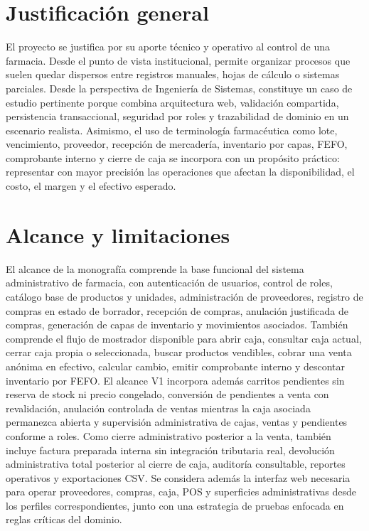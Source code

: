 \section{Justificación general}

El proyecto se justifica por su aporte técnico y operativo al control de una farmacia. Desde el punto de vista institucional, permite organizar procesos que suelen quedar dispersos entre registros manuales, hojas de cálculo o sistemas parciales. Desde la perspectiva de Ingeniería de Sistemas, constituye un caso de estudio pertinente porque combina arquitectura web, validación compartida, persistencia transaccional, seguridad por roles y trazabilidad de dominio en un escenario realista. Asimismo, el uso de terminología farmacéutica como lote, vencimiento, proveedor, recepción de mercadería, inventario por capas, FEFO, comprobante interno y cierre de caja se incorpora con un propósito práctico: representar con mayor precisión las operaciones que afectan la disponibilidad, el costo, el margen y el efectivo esperado.

\section{Alcance y limitaciones}

El alcance de la monografía comprende la base funcional del sistema administrativo de farmacia, con autenticación de usuarios, control de roles, catálogo base de productos y unidades, administración de proveedores, registro de compras en estado de borrador, recepción de compras, anulación justificada de compras, generación de capas de inventario y movimientos asociados. También comprende el flujo de mostrador disponible para abrir caja, consultar caja actual, cerrar caja propia o seleccionada, buscar productos vendibles, cobrar una venta anónima en efectivo, calcular cambio, emitir comprobante interno y descontar inventario por FEFO. El alcance V1 incorpora además carritos pendientes sin reserva de stock ni precio congelado, conversión de pendientes a venta con revalidación, anulación controlada de ventas mientras la caja asociada permanezca abierta y supervisión administrativa de cajas, ventas y pendientes conforme a roles. Como cierre administrativo posterior a la venta, también incluye factura preparada interna sin integración tributaria real, devolución administrativa total posterior al cierre de caja, auditoría consultable, reportes operativos y exportaciones CSV. Se considera además la interfaz web necesaria para operar proveedores, compras, caja, POS y superficies administrativas desde los perfiles correspondientes, junto con una estrategia de pruebas enfocada en reglas críticas del dominio.

